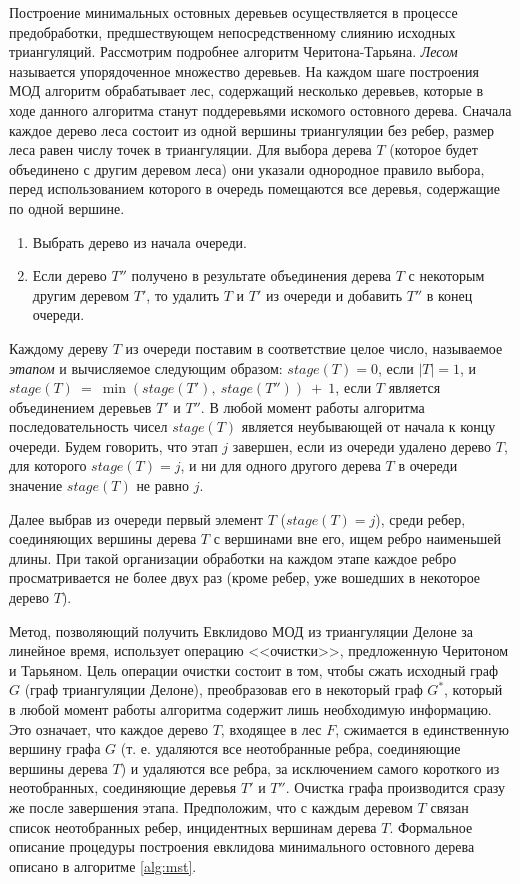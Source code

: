 \documentclass[12pt]{article}
\begin{document}
Построение минимальных остовных деревьев осуществляется в процессе предобработки,
предшествующем непосредственному слиянию исходных триангуляций.
Рассмотрим подробнее алгоритм Черитона-Тарьяна.
{\itshape Лесом} называется упорядоченное множество деревьев.
На каждом шаге построения МОД алгоритм обрабатывает лес, содержащий несколько деревьев,
которые в ходе данного алгоритма станут поддеревьями искомого остовного дерева.
Сначала каждое дерево леса состоит из одной вершины триангуляции без ребер,
размер леса равен числу точек в триангуляции.
Для выбора дерева $T$ (которое будет объединено с другим деревом леса) они указали однородное правило выбора, перед использованием которого в очередь помещаются все деревья, содержащие по одной вершине.
\begin{enumerate}
	\item Выбрать дерево из начала очереди.
	\item Если дерево $T''$ получено в результате объединения дерева $T$ с некоторым другим деревом $T'$,
		то удалить $T$ и $T'$ из очереди и добавить $T''$ в конец очереди.
\end{enumerate}

Каждому дереву $T$ из очереди поставим в соответствие целое число, называемое {\itshape этапом} и вычисляемое следующим образом:
$stage(T) = 0$, если $|T| = 1$, и $stage(T)~=~\min(stage(T'),~stage(T''))~+~1$,
если $T$ является объединением деревьев $T'$ и $T''$.
В любой момент работы алгоритма последовательность чисел $stage(T)$ является неубывающей от начала к концу очереди.
Будем говорить, что этап $j$ завершен, если из очереди удалено дерево $T$,
для которого $stage(T) = j$, и ни для одного другого дерева $T$ в очереди значение $stage(T)$ не равно $j$.

Далее выбрав из очереди первый элемент $T$ ($stage(T) = j$), среди ребер,
соединяющих вершины дерева $T$ с вершинами вне его, ищем ребро наименьшей длины.
При такой организации обработки на каждом этапе каждое ребро просматривается не более двух раз
(кроме ребер, уже вошедших в некоторое дерево $T$).

Метод, позволяющий получить Евклидово МОД из триангуляции Делоне за линейное время,
использует операцию <<очистки>>, предложенную Черитоном и Тарьяном.
Цель операции очистки состоит в том, чтобы сжать исходный граф $G$ (граф триангуляции Делоне),
преобразовав его в некоторый граф $G^*$, который в любой момент работы алгоритма содержит лишь необходимую информацию.
Это означает, что каждое дерево $T$, входящее в лес $F$, сжимается в единственную вершину графа $G$
(т. е. удаляются все неотобранные ребра, соединяющие вершины дерева $T$) и
удаляются все ребра, за исключением самого короткого из неотобранных, соединяющие деревья $T'$ и $T''$.
Очистка графа производится сразу же после завершения этапа.
Предположим, что с каждым деревом $T$ связан список неотобранных ребер, инцидентных вершинам дерева $T$.
Формальное описание процедуры построения евклидова минимального остовного дерева описано в алгоритме \ref{alg:mst}.
\end{document}
